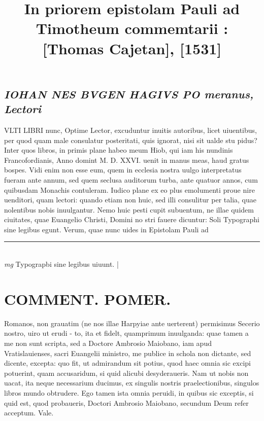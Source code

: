\documentclass{article}
\begin{document}
\date{}
        \title{In priorem epistolam Pauli ad Timotheum commemtarii : [Thomas Cajetan], [1531]}
\maketitle
\tableofcontents
\clearpage
\begin{pages} 
\beginnumbering
        
{}
\subsection*{\textit{IOHAN NES BVGEN HAGIVS PO meranus, Lectori}}\pstart VLTI LIBRI nunc, Optime Lector, excuduntur inuitis autoribus, licet uiuentibus, per quod quam male consulatur posteritati, quis ignorat, nisi sit ualde stu pidus? Inter quos libros, in primis plane habeo meum Hiob, qui iam his nundinis Francofordianis, Anno domint M. D. XXVI. uenit in manus meas, haud gratus bospes. Vidi enim non esse eum, quem in ecclesia nostra uulgo interpretatus fueram ante annum, sed quem seclusa auditorum turba, ante quatuor annos, cum quibusdam Monachis contuleram. Iudico plane ex eo plus emolumenti proue nire uenditori, quam lectori: quando etiam non huic, sed illi consulitur per talia, quae nolentibus nobis inuulgantur. Nemo huic pesti cupit subuentum, ne illae quidem ciuitates, quae Euangelio Christi, Domini no stri fauere dicuntur: Soli Typographi sine legibus egunt. Verum, quae nunc uides in Epistolam Pauli ad  \pend
\vspace{0.5cm}\noindent
\vspace{0.2cm}\rule{1cm}{0.2pt}\\ 
\hspace{0.2cm}\textit{mg}
\footnotesize Typograpbi sine legibus uiuunt. 
\normalsize| 
\section*{COMMENT. POMER.  }\pstart Romanos, non grauatim (ne nos illae Harpyiae ante uerterent) permisimus Secerio nostro, uiro ut erudi - to, ita et fidelt, quamprimum inuulganda: quae tamen a me non sunt scripta, sed a Doctore Ambrosio Maiobano, iam apud Vratislauienses, sacri Euangelii ministro, me publice in schola non dictante, sed dicente, excepta: quo fit, ut admirandum sit potius, quod haec omnia sic excipi potuerint, quam accusaridum, si quid alicubi desyderaueris. Nam ut nobis non uacat, ita neque necessarium ducimus, ex singulis nostris praelectionibus, singulos libros mundo obtrudere. Ego tamen ista omnia peruidi, in quibus sic exceptis, si quid est, quod probaueris, Doctori Ambrosio Maiobano, secundum Deum refer acceptum.  Vale.   \pend
{}
{}

\end{pages}
\end{document}
